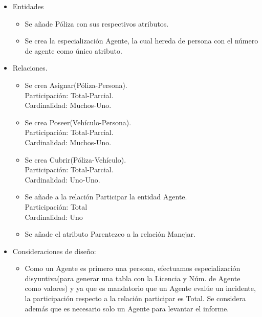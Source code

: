 \documentclass{exam}
\begin{document}
\begin{questions}
\begin{enumerate}[label=\roman*]
	    
	    \begin{itemize}
	        \item Entidades
	        \begin{itemize}
	            \item Se añade Póliza con sus respectivos atributos.
	            
	            \item Se crea la especialización Agente, la cual hereda de persona con el número de agente como único atributo.
	        \end{itemize}
	        
	        \item Relaciones.
	        \begin{itemize}
	            \item Se crea Asignar(Póliza-Persona).\\
	            Participación: Total-Parcial.\\
	            Cardinalidad: Muchos-Uno.
	            
	            \item Se crea Poseer(Vehículo-Persona).\\
	            Participación: Total-Parcial.\\
	            Cardinalidad: Muchos-Uno.
	            
	            \item Se crea Cubrir(Póliza-Vehículo).\\
	            Participación: Total-Parcial.\\
	            Cardinalidad: Uno-Uno.
	            
	            \item Se añade a la relación Participar la entidad Agente.\\
	            Participación: Total\\
	            Cardinalidad: Uno
	            
	            \item Se añade el atributo Parentezco a la relación Manejar.
	            
	        \end{itemize}
	        
	        \item Consideraciones de diseño:
	        
	        \begin{itemize}
	            \item Como un Agente es primero una persona, efectuamos especialización disyuntiva(para generar una tabla con la Licencia y Núm. de Agente como valores) y ya que es mandatorio que un Agente evalúe un incidente, la participación respecto a la relación participar es Total. Se considera además que es necesario solo un Agente para levantar el informe.
	            

\end{itemize}
\end{itemize}
\end{enumerate}
\end{questions}
\end{document}
